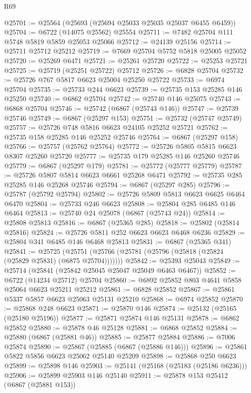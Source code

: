 \begin{lexlean}{R69}
\begin{coremodule}
{@25701 := @25564 (@25693 (@25694 @25033 @25035 @25037 @6455 @6459))
@25704 := @6722 (@14075 @25562) @25554
@25711 := @7482 @25704 @111 @5748 @5819 @5859 @25053 @25066
@25712 := @24139 @25156
@25714 := @25711 @25712 @25212
@25719 := @7669 @25704 @5752 @5818 @25005 @25052
@25720 := @25269 @6471
@25721 := @25261 @25720
@25722 := @25253 @25721
@25725 := @25719 (@25251 @25722) @25712
@25726 := @6828 @25704
@25732 := @25726 @767 @5817 @6623 @25004 @25250 @25722
@25733 := @6974 @25704
@25735 := @25733 @244 @6623
@25739 := @25735 @153 @25285 @146 @25250
@25740 := @6862 @25704
@25742 := @25740 @146 @25075
@25743 := @6868 @25704
@25746 := @25742 (@6867 (@25743 @146))
@25747 := @25739 @25746
@25749 := @6867 (@25297 @153)
@25751 := @25732 (@25747 @25749)
@25757 := @25726 @748 @5816 @6623 @24105 @25252 @25721
@25762 := @25735 @158 @25285 @146 @25252 @25746
@25764 := @6867 (@25297 @158)
@25766 := @25757 (@25762 @25764)
@25772 := @25726 @5805 @5815 @6623 @8307 @25260 @25720
@25777 := @25735 @179 @25285 @146 @25260 @25746
@25779 := @6867 (@25297 @179)
@25781 := @25772 (@25777 @25779)
@25787 := @25726 @5807 @5814 @6623 @6661 @25268 @6471
@25792 := @25735 @285 @25285 @146 @25268 @25746
@25794 := @6867 (@25297 @285)
@25796 := @25787 (@25792 @25794)
@25802 := @25726 @5809 @5813 @6623 @6625 @6464 @6470
@25804 := @25733 @246 @6623
@25808 := @25804 @285 @6485 @146 @6464
@25813 := @25740 @24 @25078 (@6867 (@25743 @24))
@25814 := @25808 @25813
@25816 := @6867 (@25365 @285)
@25818 := @25802 (@25814 @25816)
@25824 := @25726 @5811 @252 @6623 @6623 @6468 @6236
@25829 := @25804 @341 @6485 @146 @6468 @25813
@25831 := @6867 (@25365 @341)
@25841 := @25725
    (@25751 (@25766 (@25781 (@25796 (@25818 (@25824 (@25829 @25831) (@6875 @25704)))))))
@25842 := @25393 @25043
@25849 := @25714 (@25841 (@25842 @25045 @25047 @25049 @6463 @6467))
@25852 := @6722 (@14234 @25712) @25704
@25860 := @6892 @25852 @803 @4641 @5858 @25064 @6623 @25211 @25212
@25861 := @6828 @25852
@25867 := @25861 @5337 @5857 @6623 @25063 @25131 @25210
@25868 := @6974 @25852
@25870 := @25868 @248 @6623
@25871 := @25870 @146
@25874 := @25132 (@25165 (@25180 @25196))
@25877 := @25871 @25874 @146 @25131
@25878 := @6862 @25852
@25880 := @25878 @46 @25128
@25881 := @6868 @25852
@25884 := @25880 (@6867 (@25881 @46))
@25885 := @25877 @25884
@25886 := @7006 @25874
@25890 := @25867 (@25885 (@6867 (@25886 @146)))
@25896 := @25861 @5822 @5856 @6623 @25062 @25140 @25209
@25898 := @25868 @250 @6623
@25899 := @25898 @146
@25903 := @25141 (@25168 (@25183 (@25186 @6236)))
@25906 := @25899 @25903 @146 @25140
@25911 := @25878 @153 @25412 (@6867 (@25881 @153))
}
\end{coremodule}
\end{lexlean}
